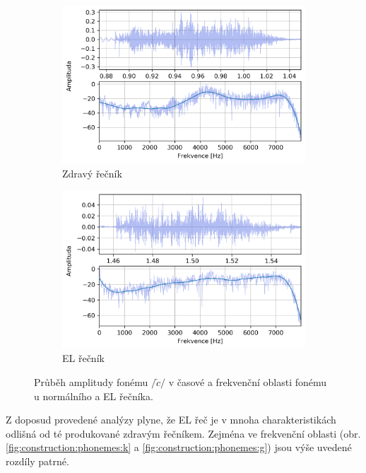 \begin{figure}[htpb]
  \centering
  \begin{subfigure}[b]{0.45\textwidth}
    \includegraphics[width=\textwidth]{./ch5-construction/img/signal-normal_c.png}
    \caption{Zdravý řečník}
    \label{fig:construction:phonemes:c:normal}
  \end{subfigure}
  \begin{subfigure}[b]{0.45\textwidth}
    \includegraphics[width=\textwidth]{./ch5-construction/img/signal-el_c.png}
    \caption{EL řečník}
    \label{fig:construction:phonemes:c:el}
  \end{subfigure}
  \caption{Průběh amplitudy fonému $/\check{c}/$ v časové a frekvenční oblasti fonému u normálního a EL řečníka.}
  \label{fig:construction:phonemes:c}
\end{figure}

Z doposud provedené analýzy plyne, že EL řeč je v mnoha charakteristikách odlišná od té produkované zdravým řečníkem.
Zejména ve frekvenční oblasti (obr. \ref{fig:construction:phonemes:k} a \ref{fig:construction:phonemes:g}) jsou výše uvedené rozdíly patrné.

